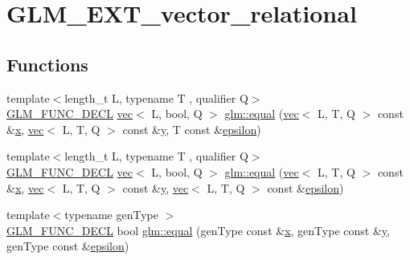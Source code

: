 \hypertarget{group__ext__vector__relational}{}\section{G\+L\+M\+\_\+\+E\+X\+T\+\_\+vector\+\_\+relational}
\label{group__ext__vector__relational}
\subsection*{Functions}
\begin{DoxyCompactItemize}
\item 
{\footnotesize template$<$length\+\_\+t L, typename T , qualifier Q$>$ }\\\hyperlink{setup_8hpp_ab2d052de21a70539923e9bcbf6e83a51}{G\+L\+M\+\_\+\+F\+U\+N\+C\+\_\+\+D\+E\+CL} \hyperlink{structglm_1_1vec}{vec}$<$ L, bool, Q $>$ \hyperlink{group__ext__vector__relational_gae630b1f87fbd3b762ca46b0b8b32b02e}{glm\+::equal} (\hyperlink{structglm_1_1vec}{vec}$<$ L, T, Q $>$ const \&\hyperlink{_s_d_l__opengl_8h_ad0e63d0edcdbd3d79554076bf309fd47}{x}, \hyperlink{structglm_1_1vec}{vec}$<$ L, T, Q $>$ const \&\hyperlink{_s_d_l__opengl_8h_a1675d9d7bb68e1657ff028643b4037e3}{y}, T const \&\hyperlink{group__gtc__constants_ga2a1e57fc5592b69cfae84174cbfc9429}{epsilon})
\item 
{\footnotesize template$<$length\+\_\+t L, typename T , qualifier Q$>$ }\\\hyperlink{setup_8hpp_ab2d052de21a70539923e9bcbf6e83a51}{G\+L\+M\+\_\+\+F\+U\+N\+C\+\_\+\+D\+E\+CL} \hyperlink{structglm_1_1vec}{vec}$<$ L, bool, Q $>$ \hyperlink{group__ext__vector__relational_ga6fb2432528edd028e3c2cf5b78d99797}{glm\+::equal} (\hyperlink{structglm_1_1vec}{vec}$<$ L, T, Q $>$ const \&\hyperlink{_s_d_l__opengl_8h_ad0e63d0edcdbd3d79554076bf309fd47}{x}, \hyperlink{structglm_1_1vec}{vec}$<$ L, T, Q $>$ const \&\hyperlink{_s_d_l__opengl_8h_a1675d9d7bb68e1657ff028643b4037e3}{y}, \hyperlink{structglm_1_1vec}{vec}$<$ L, T, Q $>$ const \&\hyperlink{group__gtc__constants_ga2a1e57fc5592b69cfae84174cbfc9429}{epsilon})
\item 
{\footnotesize template$<$typename gen\+Type $>$ }\\\hyperlink{setup_8hpp_ab2d052de21a70539923e9bcbf6e83a51}{G\+L\+M\+\_\+\+F\+U\+N\+C\+\_\+\+D\+E\+CL} bool \hyperlink{group__ext__vector__relational_gac4ae021e79693174e4de6560d159b33a}{glm\+::equal} (gen\+Type const \&\hyperlink{_s_d_l__opengl_8h_ad0e63d0edcdbd3d79554076bf309fd47}{x}, gen\+Type const \&\hyperlink{_s_d_l__opengl_8h_a1675d9d7bb68e1657ff028643b4037e3}{y}, gen\+Type const \&\hyperlink{group__gtc__constants_ga2a1e57fc5592b69cfae84174cbfc9429}{epsilon})

\end{DoxyCompactItemize}
